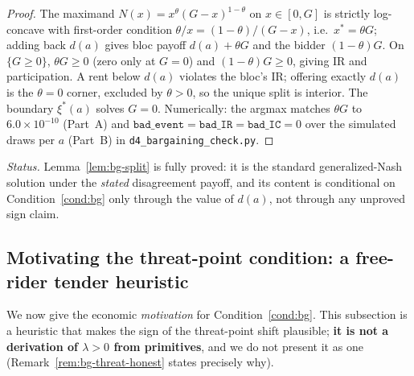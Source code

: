 \begin{proof}
The maximand $N(x)=x^{\theta}(G-x)^{1-\theta}$ on $x\in[0,G]$ is strictly
log-concave with first-order condition $\theta/x=(1-\theta)/(G-x)$, i.e.\
$x^{\ast}=\theta G$; adding back $d(a)$ gives bloc payoff $d(a)+\theta G$ and the
bidder $(1-\theta)G$. On $\{G\ge0\}$, $\theta G\ge0$ (zero only at $G=0$) and
$(1-\theta)G\ge0$, giving IR and participation. A rent below $d(a)$ violates the
bloc's IR; offering exactly $d(a)$ is the $\theta=0$ corner, excluded by
$\theta>0$, so the unique split is interior. The boundary $\xi^{\ast}(a)$ solves
$G=0$. Numerically: the argmax matches $\theta G$ to $6.0\times10^{-10}$ (Part~A)
and $\texttt{bad\_event}=\texttt{bad\_IR}=\texttt{bad\_IC}=0$ over the simulated
draws per $a$ (Part~B) in \texttt{d4\_bargaining\_check.py}.
\end{proof}

\noindent\emph{Status.} Lemma~\ref{lem:bg-split} is fully proved: it is the
standard generalized-Nash solution under the \emph{stated} disagreement payoff,
and its content is conditional on Condition~\ref{cond:bg} only through the value
of $d(a)$, not through any unproved sign claim.

\subsection{Motivating the threat-point condition: a free-rider tender heuristic}
\label{app:bg-threat}

We now give the economic \emph{motivation} for Condition~\ref{cond:bg}. This
subsection is a heuristic that makes the sign of the threat-point shift plausible;
\textbf{it is not a derivation of $\lambda>0$ from primitives}, and we do not
present it as one (Remark~\ref{rem:bg-threat-honest} states precisely why).


